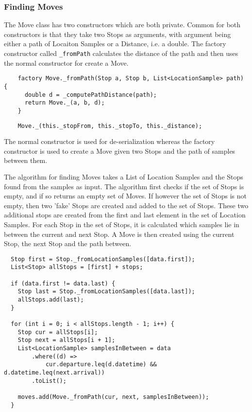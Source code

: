 \subsubsection{Finding Moves}
The Move class has two constructors which are both private. Common for both constructors is that they take two Stops as arguments, with argument being either a path of Locaiton Samples or a Distance, i.e. a double. The factory constructor called \verb|_fromPath| calculates the distance of the path and then uses the normal constructor for create a Move. 
\begin{verbatim}
    factory Move._fromPath(Stop a, Stop b, List<LocationSample> path) {
      double d = _computePathDistance(path);
      return Move._(a, b, d);
    }
\end{verbatim}

\begin{verbatim}
    Move._(this._stopFrom, this._stopTo, this._distance);
\end{verbatim}
The normal constructor is used for de-serialization whereas the factory constructor is used to create a Move given two Stops and the path of samples between them.

The algorithm for finding Moves takes a List of Location Samples and the Stops found from the samples as input. The algorithm first checks if the set of Stops is empty, and if so returns an empty set of Moves. If however the set of Stops is not empty, then two 'fake' Stops are created and added to the set of Stops. These two additional stops are created from the first and last element in the set of Location Samples. For each Stop in the set of Stops, it is calculated which samples lie in between the current and next Stop. A Move is then created using the current Stop, the next Stop and the path between. 

\begin{verbatim}
  Stop first = Stop._fromLocationSamples([data.first]);
  List<Stop> allStops = [first] + stops;

  if (data.first != data.last) {
    Stop last = Stop._fromLocationSamples([data.last]);
    allStops.add(last);
  }

  for (int i = 0; i < allStops.length - 1; i++) {
    Stop cur = allStops[i];
    Stop next = allStops[i + 1];
    List<LocationSample> samplesInBetween = data
        .where((d) =>
            cur.departure.leq(d.datetime) && d.datetime.leq(next.arrival))
        .toList();

    moves.add(Move._fromPath(cur, next, samplesInBetween));
  }
\end{verbatim}

